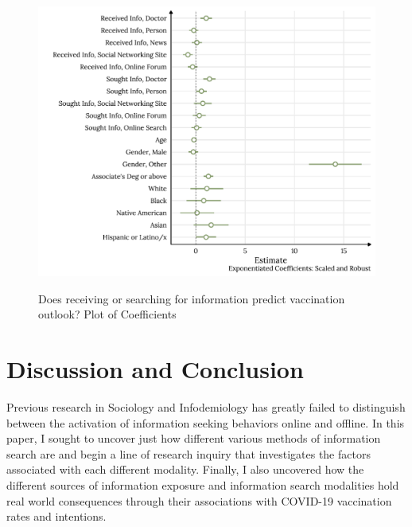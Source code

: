 \begin{figure}[h]
{\centering \includegraphics[width=0.8\linewidth]{figs/paper2/plot-model-3-1}}
\caption{Does receiving or searching for information predict vaccination outlook? Plot of Coefficients}\label{fig:plot-model-3}
\end{figure}

\hypertarget{discussion}{%
\section{Discussion and Conclusion}\label{discussion}}

Previous research in Sociology and Infodemiology has greatly failed to
distinguish between the activation of information seeking behaviors online and
offline. In this paper, I sought to uncover just how different various methods of
information search are and begin a line of research inquiry that investigates
the factors associated with each different modality. Finally, I also uncovered
how the different sources of information exposure and information search
modalities hold real world consequences through their associations with COVID-19
vaccination rates and intentions.


